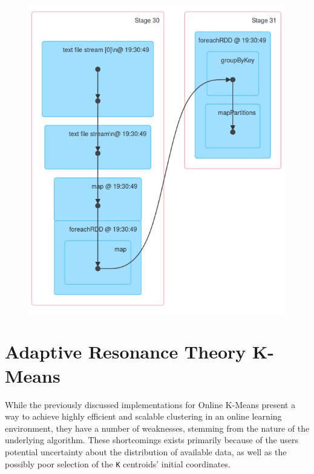 \documentclass{l4proj}
\begin{document}
\begin{figure}[H]
\begin{minipage}{.45\textwidth}
  \label{fig:dag5}
\end{minipage}%
\begin{minipage}{.55\textwidth}
  \centering
  \includegraphics[width=1.1\linewidth]{images/DAG6}
  \label{fig:dag6}
\end{minipage}
\end{figure}


\chapter{Adaptive Resonance Theory K-Means}
\label{art}

While the previously discussed implementations for Online K-Means present a way to achieve highly efficient and scalable clustering in an online learning environment, they have a number of weaknesses, stemming from the nature of the underlying algorithm. These shortcomings exists primarily because of the users potential uncertainty about the distribution of available data, as well as the possibly poor selection of the \texttt{K} centroids' initial coordinates.
\end{document}
